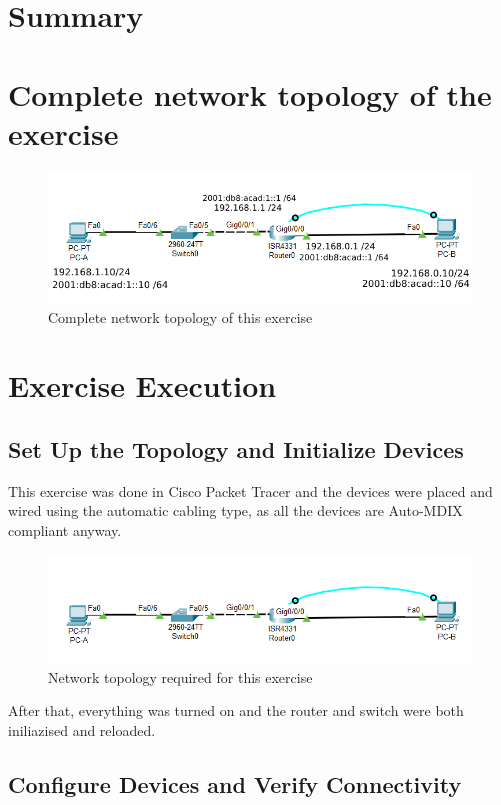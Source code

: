 \documentclass[a4paper]{article}
\newcommand{\abc}{\hfill \break}
\begin{document}
\section{Summary}

\newpage

\section{Complete network topology of the exercise}
\begin{figure}[h]
	\includegraphics[scale=0.65]{images/nwtopology2.png}
	\centering
	\caption{Complete network topology of this exercise}
\end{figure}

\newpage

\section{Exercise Execution}
\subsection{Set Up the Topology and Initialize Devices}
This exercise was done in Cisco Packet Tracer and the devices were placed and wired using the automatic cabling type, as all the devices are Auto-MDIX compliant anyway.\abc
\begin{figure}[h]
	\includegraphics[scale=0.45]{images/nwtopology.png}
	\centering
	\caption{Network topology required for this exercise}
\end{figure}\abc
After that, everything was turned on and the router and switch were both iniliazised and reloaded.

\subsection{Configure Devices and Verify Connectivity}
\end{document}
